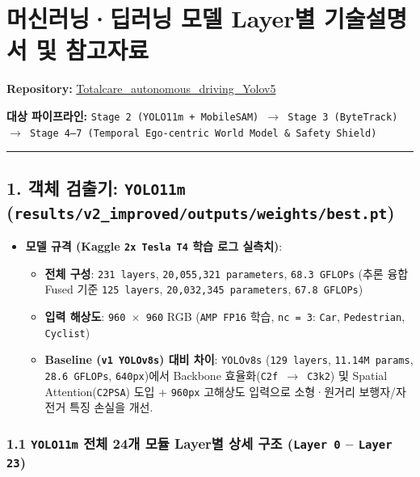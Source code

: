 \documentclass[10.5pt,a4paper]{article}
\begin{document}
\section{머신러닝·딥러닝 모델 Layer별 기술설명서 및 참고자료}

\textbf{Repository:} \href{https://github.com/Heisnotanimposter/Totalcare\_autonomous\_driving\_Yolov5}{Totalcare\_autonomous\_driving\_Yolov5}

\textbf{대상 파이프라인:} \texttt{Stage 2 (YOLO11m + MobileSAM) $\rightarrow$ Stage 3 (ByteTrack) $\rightarrow$ Stage 4--7 (Temporal Ego-\allowbreak{}centric World Model \& Safety Shield)}


\par\noindent\rule{\textwidth}{0.4pt}\par\medskip

\subsection{1. 객체 검출기: \texttt{YOLO11m} (\texttt{results/\allowbreak{}v2\_\allowbreak{}improved/\allowbreak{}outputs/\allowbreak{}weights/\allowbreak{}best.\allowbreak{}pt})}

\begin{itemize}[leftmargin=1.5em,itemsep=2pt]
\item \textbf{모델 규격 (Kaggle \texttt{2x Tesla T4} 학습 로그 실측치)}:
\begin{itemize}[leftmargin=1.5em,itemsep=2pt]
\item \textbf{전체 구성}: \texttt{231 layers}, \texttt{20,\allowbreak{}055,\allowbreak{}321 parameters}, \texttt{68.\allowbreak{}3 GFLOPs} (추론 융합 Fused 기준 \texttt{125 layers}, \texttt{20,\allowbreak{}032,\allowbreak{}345 parameters}, \texttt{67.\allowbreak{}8 GFLOPs})
\item \textbf{입력 해상도}: \texttt{960 $\times$ 960} RGB (\texttt{AMP FP16} 학습, \texttt{nc = 3}: \texttt{Car}, \texttt{Pedestrian}, \texttt{Cyclist})
\item \textbf{Baseline (\texttt{v1 YOLOv8s}) 대비 차이}: \texttt{YOLOv8s} (\texttt{129 layers}, \texttt{11.\allowbreak{}14M params}, \texttt{28.\allowbreak{}6 GFLOPs}, \texttt{640px})에서 Backbone 효율화(\texttt{C2f $\rightarrow$ C3k2}) 및 Spatial Attention(\texttt{C2PSA}) 도입 + \texttt{960px} 고해상도 입력으로 소형·원거리 보행자/자전거 특징 손실을 개선.
\end{itemize}
\end{itemize}

\subsubsection{1.1 \texttt{YOLO11m} 전체 24개 모듈 Layer별 상세 구조 (\texttt{Layer 0} -- \texttt{Layer 23})}
\end{document}
